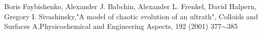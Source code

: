 \documentclass[autodetect-engine,dvipdfmx-if-dvi,ja=standard,a4paper,11pt]{bxjsarticle} %
\begin{document}








\begin{thebibliography}{9999}%
Boris Faybishenko, Alexander J. Babchin, Alexander L. Frenkel, David Halpern, Gregory I. Sivashinsky,"A
model of chaotic evolution of an ultrath", Colloids and Surfaces A,Physicochemical and Engineering Aspects,
192 (2001) 377$\sim$385
\end{thebibliography}

\end{document}
